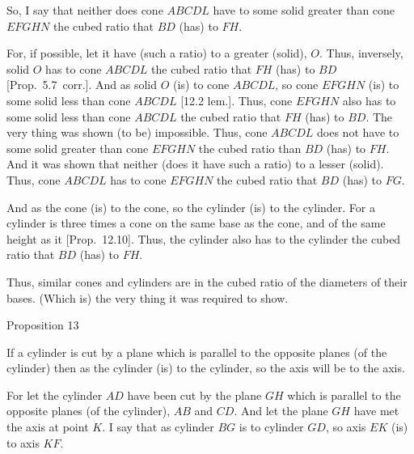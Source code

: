 So, I say that neither does cone $ABCDL$ have to some solid greater than cone $EFGHN$ the cubed ratio
that $BD$ (has) to $FH$.

For, if possible, let it have (such a ratio) to a greater (solid), $O$. Thus, inversely,  solid $O$ has to
cone $ABCDL$ the cubed ratio that $FH$ (has) to $BD$ [Prop.~5.7~corr.]. 
And as solid $O$ (is) to cone $ABCDL$, so cone $EFGHN$ (is) to some solid less than cone
$ABCDL$ [12.2 lem.]. Thus, cone $EFGHN$ also has to some solid less than cone $ABCDL$ the cubed
ratio that $FH$ (has) to $BD$. The very thing was shown (to be) impossible. Thus, cone $ABCDL$
does not have to some solid greater than cone $EFGHN$ the cubed ratio than $BD$ (has) to $FH$. And
it was shown that neither (does it have such a ratio) to a lesser (solid).  Thus, cone $ABCDL$ has
to cone $EFGHN$ the cubed ratio that $BD$ (has) to $FG$.

And as the cone (is) to the cone, so the cylinder (is) to the cylinder. For a
cylinder is three times a cone on the same base as the cone, and of the same height as it [Prop.~12.10]. 
Thus, the cylinder also has to the cylinder the cubed ratio that $BD$ (has) to $FH$.

Thus, similar cones and cylinders are in the cubed ratio of the diameters of
their bases. (Which is) the
very thing it was required to show.


\begin{center}
{\large Proposition 13}
\end{center}

If a cylinder is cut by a plane which is parallel to the opposite planes (of the cylinder) then
as the cylinder (is) to the cylinder, so the axis will be to the axis.

\epsfysize=1.1in
\centerline{}

For let the cylinder $AD$ have been cut by the plane $GH$ which is parallel to the opposite planes (of the cylinder), $AB$
and $CD$. And let the plane $GH$ have met the axis at point $K$. I say that as cylinder $BG$
is to cylinder $GD$, so axis $EK$ (is) to axis $KF$.

